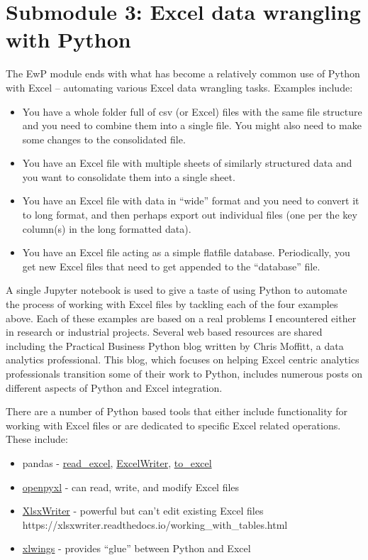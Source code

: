 \documentclass[ited,blindrev]{informs3}              %
\begin{document}
\section{Submodule 3: Excel data wrangling with Python}

The EwP module ends with what has become a relatively common use of Python with Excel -- automating various Excel data wrangling tasks. Examples include:

\begin{itemize}
	\item
	You have a whole folder full of csv (or Excel) files with the same
	file structure and you need to combine them into a single file. You
	might also need to make some changes to the consolidated file.
	\item
	You have an Excel file with multiple sheets of similarly structured
	data and you want to consolidate them into a single sheet.
	\item
	You have an Excel file with data in ``wide'' format and you need to
	convert it to long format, and then perhaps export out individual
	files (one per the key column(s) in the long formatted data).
	\item
	You have an Excel file acting as a simple flatfile database.
	Periodically, you get new Excel files that need to get appended to the
	``database'' file.
\end{itemize}

A single Jupyter notebook is used to give a taste of using Python to automate the process of working with Excel files by tackling each of the four examples above. Each of these examples are based on a real problems I encountered either in research or industrial projects. Several web based resources are shared including the Practical Business Python blog \cite{bibid} written by Chris Moffitt, a data analytics professional. This blog, which focuses on helping Excel centric analytics professionals transition some of their work to Python, includes numerous posts on different aspects of Python and Excel integration.  

There are a number of Python based tools that either include functionality for working with Excel files or are dedicated to specific Excel related operations. These include:

\begin{itemize}
	\item
	pandas -
	\href{https://pandas.pydata.org/docs/reference/api/pandas.read_excel.html}{read\_excel},
	\href{https://pandas.pydata.org/docs/reference/api/pandas.ExcelWriter.html}{ExcelWriter},
	\href{https://pandas.pydata.org/docs/reference/api/pandas.DataFrame.to_excel.html}{to\_excel}
	\item
	\href{https://openpyxl.readthedocs.io/en/stable/}{openpyxl} - can
	read, write, and modify Excel files
	\item
	\href{https://xlsxwriter.readthedocs.io/}{XlsxWriter} - powerful but
	can't edit existing Excel files
	https://xlsxwriter.readthedocs.io/working\_with\_tables.html
	\item
	\href{https://www.xlwings.org/}{xlwings} - provides ``glue'' between
	Python and Excel
\end{itemize}
\end{document}
